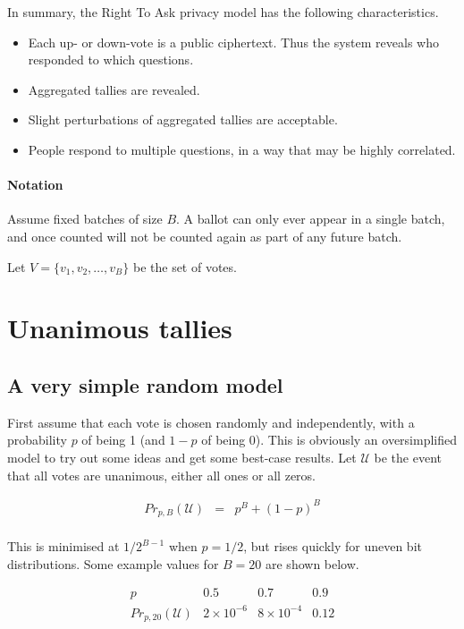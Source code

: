 \documentclass[10pt,a4paper]{article}
\newcommand{\prob}{\mathit{Pr}}
\newcommand{\U}{\mathcal{U}}
\begin{document}
In summary, the Right To Ask privacy model has the following characteristics. 
\begin{itemize}
	\item Each up- or down-vote is a public ciphertext. Thus the system reveals who responded to which questions.
	\item Aggregated tallies are revealed.
	\item Slight perturbations of aggregated tallies are acceptable.
	\item People respond to multiple questions, in a way that may be highly correlated.
\end{itemize}


\paragraph{Notation} Assume fixed batches of size $B$. A ballot can only ever appear in a single batch, and once counted will not be counted again as part of any future batch. 

Let $V = \{ v_1, v_2,\ldots,v_B\}$ be the set of votes.

\section{Unanimous tallies}

\subsection{A very simple random model}
First assume that each vote is chosen randomly and independently, with a probability $p$ of being 1 (and $1-p$ of being 0). This is obviously an oversimplified model to try out some ideas and get some best-case results.
Let $\U$ be the event that all votes are unanimous, either all ones or all zeros.

$$
\begin{array}{rcl}
	\prob_{p,B}(\U) & = & p^{B} + (1-p)^B \\
\end{array}
$$

This is minimised at $1/2^{B-1}$ when $p=1/2$, but rises quickly for uneven bit distributions. Some example values for $B=20$ are shown below.

$$
\begin{array}{cccc}
p & 0.5 & 0.7 & 0.9 \\
\prob_{p,20}(\U) & 2 \times 10^{-6} & 8 \times 10^{-4} & 0.12
\end{array}
$$
\end{document}
